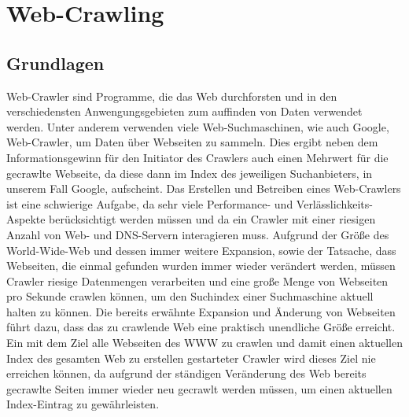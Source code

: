 \documentclass[12pt, a4paper]{llncs}
\begin{document}
	\section{Web-Crawling}\label{sec:google}
	\subsection{Grundlagen}
	Web-Crawler sind Programme, die das Web durchforsten und in den verschiedensten Anwengungsgebieten zum auffinden von Daten
	verwendet werden. Unter anderem verwenden viele Web-Suchmaschinen, wie auch Google, Web-Crawler, um Daten
	über Webseiten zu sammeln. Dies ergibt neben dem Informationsgewinn für den Initiator des Crawlers auch einen
	Mehrwert für die gecrawlte Webseite, da diese dann im Index des jeweiligen Suchanbieters, in unserem Fall Google,
	aufscheint\cite{giles10}.
	Das Erstellen und Betreiben eines Web-Crawlers ist eine schwierige Aufgabe, da sehr viele Performance- und Verlässlichkeits-
	Aspekte berücksichtigt werden müssen und da ein Crawler mit einer riesigen Anzahl von Web- und DNS-Servern interagieren
	muss\cite{page98}.
	Aufgrund der Größe des World-Wide-Web und dessen immer weitere Expansion, sowie der Tatsache, dass Webseiten, die
	einmal gefunden wurden immer wieder verändert werden, müssen Crawler riesige Datenmengen verarbeiten und eine große
	Menge von Webseiten pro Sekunde crawlen können, um den Suchindex einer Suchmaschine aktuell halten zu können\cite{hafri04}.
	Die bereits erwähnte Expansion und Änderung von Webseiten führt dazu, dass das zu crawlende Web eine praktisch unendliche
	Größe erreicht. Ein mit dem Ziel alle Webseiten des WWW zu crawlen und damit einen aktuellen Index des gesamten Web zu erstellen
	gestarteter Crawler wird dieses Ziel nie erreichen können, da aufgrund der ständigen Veränderung des Web bereits gecrawlte
	Seiten immer wieder neu gecrawlt werden müssen, um einen aktuellen Index-Eintrag zu gewährleisten\cite{yates05}.
	
\end{document}
